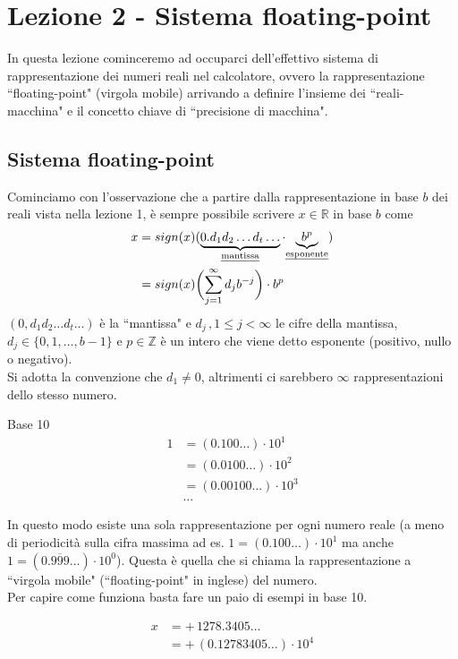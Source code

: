 \section{Lezione 2 - Sistema floating-point}
In questa lezione cominceremo ad occuparci dell'effettivo sistema di rappresentazione dei numeri reali nel calcolatore, ovvero la rappresentazione ``floating-point" (virgola mobile) arrivando a definire l'insieme dei ``reali-macchina" e il concetto chiave di ``precisione di macchina".

\subsection{Sistema floating-point}
Cominciamo con l'osservazione che a partire dalla rappresentazione in base $b$ dei reali vista nella lezione 1, è sempre possibile scrivere $x \in \mathbb{R}$ in base $b$ come 
\[ \begin{split}
    x & = sign(x)( \underbrace{0.d_1 d_2 \dotsc d_t \dotsc}_{\text {\uline{mantissa}}} \cdot {\underbrace{b^p}_{\text{\uline{esponente}}}}) \\
    & = sign(x)\biggl( \sum_{j=1}^\infty d_j b^{-j} \biggr) \cdot b^p
\end{split} \]
$(0,d_1 d_2 \dotsc d_t \dotsc)$ è la ``mantissa" e $d_j\, , 1 \le j < \infty$ le cifre della mantissa, $d_j \in \{0, 1, \dotsc , b-1\}$ e $p \in \mathbb{Z}$ è un intero che viene detto esponente (positivo, nullo o negativo). \\
Si adotta la convenzione che $d_1 \ne 0$, altrimenti ci sarebbero $\infty$ rappresentazioni dello stesso numero.
\begin{esempio}
Base 10
\[ \begin{split}
    1 & = (0.100 \dotsc) \cdot 10^1 \\
    & = (0.0100 \dotsc) \cdot 10^2 \\
    & = (0.00100 \dotsc) \cdot 10^3 \\
    & \dotsc
\end{split}\]
\end{esempio}
In questo modo esiste una sola rappresentazione per ogni numero reale (a meno di periodicità sulla cifra massima ad es. $1 = (0.100 \dotsc) \cdot 10^1$ ma anche $1 = (0.\overline{999} \dotsc) \cdot 10^0$). Questa è quella che si chiama la rappresentazione a ``virgola mobile" (``floating-point" in inglese) del numero. \\
Per capire come funziona basta fare un paio di esempi in base 10.
\begin{esempio}
\[\begin{split}
    x & = + \, 1278.3405 \dotsc \\
    & = + \, (0.12783405 \dotsc) \cdot 10^4 
\end{split}\]
\end{esempio}
